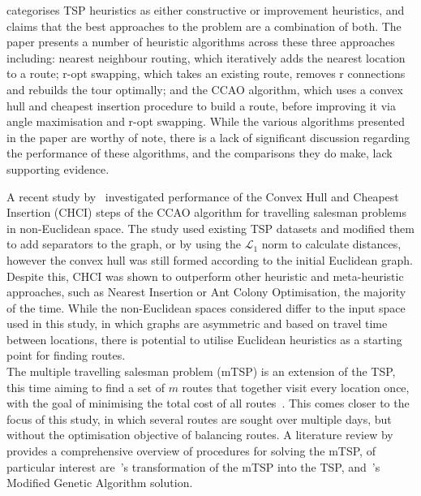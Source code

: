 \textcite{laporte1992traveling} categorises TSP heuristics as either constructive or improvement heuristics, and
claims that the best approaches to the problem are a combination of both.
The paper presents a number of heuristic algorithms across these three approaches including: nearest neighbour
routing, which iteratively adds the nearest location to a route; r-opt swapping, which takes an existing route,
removes r connections and rebuilds the tour optimally; and the CCAO algorithm, which uses a convex hull and cheapest
insertion procedure to build a route, before improving it via angle maximisation and r-opt swapping.
While the various algorithms presented in the paper are worthy of note, there is a lack of significant discussion
regarding the performance of these algorithms, and the comparisons they do make, lack supporting evidence.

A recent study by~\textcite{goutham2023convex} investigated performance of the Convex Hull and Cheapest Insertion (CHCI)
steps of the CCAO algorithm for travelling salesman problems in non-Euclidean space.
The study used existing TSP datasets and modified them to add separators to the graph, or by using the $\mathcal{L}_1$
norm to calculate distances, however the convex hull was still formed according to the initial Euclidean graph.
Despite this, CHCI was shown to outperform other heuristic and meta-heuristic approaches, such as Nearest Insertion or
Ant Colony Optimisation, the majority of the time.
While the non-Euclidean spaces considered differ to the input space used in this study, in which graphs are asymmetric
and based on travel time between locations, there is potential to utilise Euclidean heuristics as a starting point for
finding routes.\\

\noindent
The multiple travelling salesman problem (mTSP) is an extension of the TSP, this time aiming to find a set of $m$
routes that together visit every location once, with the goal of minimising the total cost of all
routes~\parencite[p. 209]{bektas2006multiple}.
This comes closer to the focus of this study, in which several routes are sought over multiple days, but without the
optimisation objective of balancing routes.
A literature review by~\textcite{bektas2006multiple} provides a comprehensive overview of procedures for solving the
mTSP, of particular interest are~\textcite{bellmore1974transformation}'s transformation of the mTSP into the TSP,
and~\textcite{tang2000multiple}'s Modified Genetic Algorithm solution.

